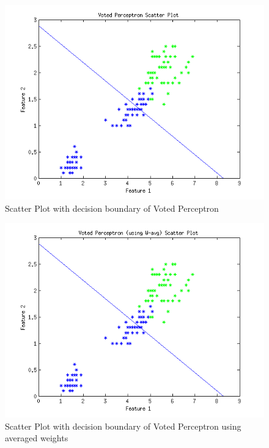 \documentclass[12pt]{article}
\begin{document}
\begin{figure}[!t]
  \centering
  \includegraphics[scale=.70]{img/voted_scatterplot.png}
  \caption{Scatter Plot with decision boundary of Voted Perceptron}
  \label{fig:votedperceptscatter1}
\end{figure}

\begin{figure}[!t]
  \centering
  \includegraphics[scale=.70]{img/voted_avg_scatterplot.png}
  \caption{Scatter Plot with decision boundary of Voted Perceptron using  averaged weights}
  \label{fig:votedperceptscatter2}
\end{figure}
\end{document}
